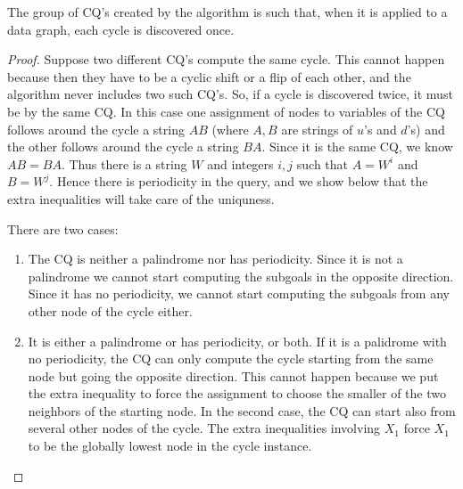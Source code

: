 \begin{theorem}
\label{auto-once-thm}
The group of CQ's created by the algorithm is such that, when it is applied to a data graph, each cycle is discovered once.
\end{theorem}

\begin{proof}
Suppose two different CQ's compute the same cycle. This cannot
happen because then they have to be a cyclic shift or a flip of each other,
and the algorithm never includes two such CQ's.
So, if a cycle is discovered twice, it must be by the same CQ.
In this case one assignment of nodes to variables of the CQ follows around the cycle a string  $AB$ (where $A,B$ are strings of $u$'s and $d$'s)
and the other follows around the cycle a string $BA$. Since it is the same CQ, we
know $AB=BA$. Thus there is a string $W$ and integers $i,j$
such that $A=W^i$ and $B=W^j$. Hence there is periodicity in the query, and we show below that the extra in\-equal\-i\-ties will take care of the uniquness.

There are two cases:

\begin{enumerate}

\item
The CQ is neither a palindrome nor has periodicity.
Since it is not a palindrome we cannot start computing the subgoals
in the opposite direction. Since it has no periodicity, we cannot
start computing the subgoals from any other node of the cycle either.

\item
It is either a palindrome or has periodicity, or both.
If it is a palidrome with no periodicity, the CQ can only compute the cycle starting from the same node but going the opposite direction. This cannot happen because
we put the extra inequality to force the assignment to choose the smaller
of the two neighbors of the starting node.
In the second case, the CQ can start also from several other nodes of
the cycle. The extra inequalities involving $X_1$ force $X_1$ to be the globally lowest node in the cycle instance.

\end{enumerate}
\end{proof}


